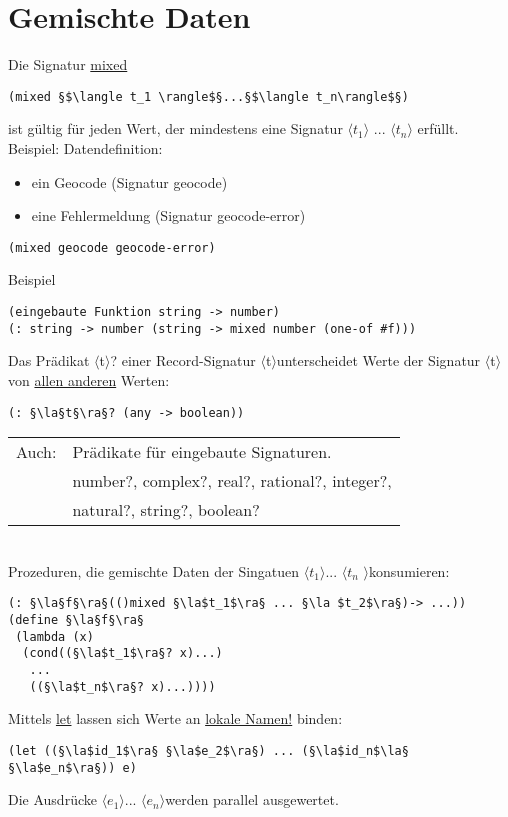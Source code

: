 \documentclass[a4paper,12pt]{article}
\newcommand{\la}{$\langle$}
\newcommand{\ra}{$\rangle$}
\begin{document}
\section{Gemischte Daten}
Die Signatur \uline{mixed}
\begin{lstlisting}[style=customc]
(mixed §$\langle t_1 \rangle$§...§$\langle t_n\rangle$§)
\end{lstlisting}
ist gültig für jeden Wert, der mindestens eine Signatur $\langle t_1 \rangle$ ... $\langle t_n\rangle$ erfüllt.\\
Beispiel: Datendefinition:
\begin{itemize}
\item ein Geocode (Signatur geocode)
\item eine Fehlermeldung (Signatur geocode-error)
\end{itemize}
\begin{lstlisting}[style=customc]
(mixed geocode geocode-error)
\end{lstlisting}
Beispiel \begin{lstlisting}[style=customc]
(eingebaute Funktion string -> number)
(: string -> number (string -> mixed number (one-of #f)))
\end{lstlisting}
Das Prädikat \la t\ra? einer Record-Signatur \la t\ra  unterscheidet Werte der Signatur \la t\ra von \uline{allen anderen} Werten:\\
\begin{lstlisting}[style=customc]
(: §\la§t§\ra§? (any -> boolean))
\end{lstlisting}
\begin{tabular}{ll}
Auch: & Prädikate für eingebaute Signaturen.\\
 & number?, complex?, real?, rational?, integer?,\\ 
 & natural?, string?, boolean?
\end{tabular}\\
Prozeduren, die gemischte Daten der Singatuen \la $t_1$\ra ... \la $t_n $ \ra konsumieren:
\begin{lstlisting}[style=customc]
(: §\la§f§\ra§(()mixed §\la$t_1$\ra§ ... §\la $t_2$\ra§)-> ...))
(define §\la§f§\ra§
 (lambda (x)
  (cond((§\la$t_1$\ra§? x)...)
   ...
   ((§\la$t_n$\ra§? x)...))))
\end{lstlisting}
Mittels \uline{let} lassen sich Werte an \uline{lokale Namen!} binden:
\begin{lstlisting}[style=customc]
(let ((§\la$id_1$\ra§ §\la$e_2$\ra§) ... (§\la$id_n$\la§ §\la$e_n$\ra§)) e)
\end{lstlisting}
Die Ausdrücke \la $e_1$\ra ... \la$e_n$\ra werden parallel ausgewertet. 
\end{document}
